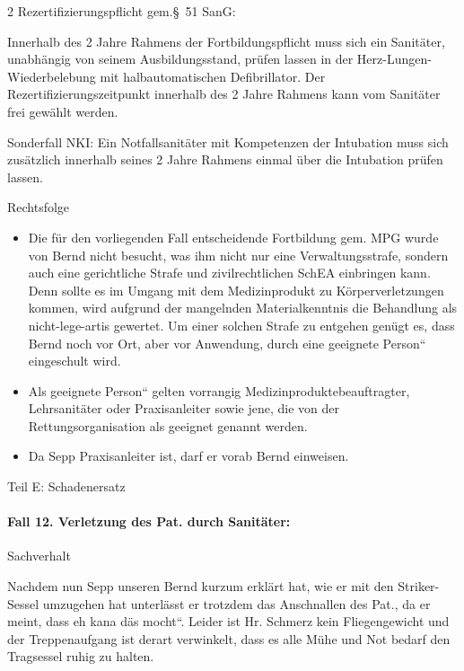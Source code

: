 \documentclass{article}
\begin{document}
\begin{multicols}{2}
Rezertifizierungspflicht gem.{\S}~51 SanG:

Innerhalb des 2 Jahre Rahmens der Fortbildungspflicht muss sich ein
Sanit\"ater, unabh\"angig von seinem Ausbildungsstand, pr\"ufen lassen
in der Herz-Lungen-Wiederbelebung mit halbautomatischen Defibrillator.
Der Rezertifizierungszeitpunkt innerhalb des 2 Jahre Rahmens kann vom
Sanit\"ater frei gew\"ahlt werden.

Sonderfall NKI: Ein Notfallsanit\"ater mit Kompetenzen der Intubation
muss sich zus\"atzlich innerhalb seines 2 Jahre Rahmens einmal \"uber
die Intubation pr\"ufen lassen.

Rechtsfolge

\begin{itemize}
\item Die f\"ur den vorliegenden Fall entscheidende Fortbildung gem. MPG
wurde von Bernd nicht besucht, was ihm nicht nur eine
Verwaltungsstrafe, sondern auch eine gerichtliche Strafe und
zivilrechtlichen SchEA einbringen kann. Denn sollte es im Umgang mit
dem Medizinprodukt zu K\"orperverletzungen kommen, wird aufgrund der
mangelnden Materialkenntnis die Behandlung als nicht-lege-artis
gewertet. Um einer solchen Strafe zu entgehen gen\"ugt es, dass Bernd
noch vor Ort, aber vor Anwendung, durch eine {\quotedblbase}geeignete
Person{\textquotedblleft} eingeschult wird. 

\item Als {\quotedblbase}geeignete Person{\textquotedblleft} gelten
vorrangig Medizinproduktebeauftragter,  Lehrsanit\"ater oder
Praxisanleiter sowie jene, die von der Rettungsorganisation als
geeignet genannt werden.

\item Da Sepp Praxisanleiter ist, darf er vorab Bernd einweisen.

\end{itemize}
\end{multicols}
Teil E: Schadenersatz

\paragraph{Fall 12. Verletzung des Pat. durch Sanit\"ater:}
Sachverhalt

Nachdem nun Sepp unseren Bernd kurzum erkl\"art hat, wie er mit den
Striker-Sessel umzugehen hat unterl\"asst er trotzdem das Anschnallen
des Pat., da er meint, dass {\quotedblbase}eh kana d\"as
mocht{\textquotedblleft}. Leider ist Hr. Schmerz kein Fliegengewicht
und der Treppenaufgang ist derart verwinkelt, dass es alle M\"uhe und
Not bedarf den Tragsessel ruhig zu halten. 
\end{document}
